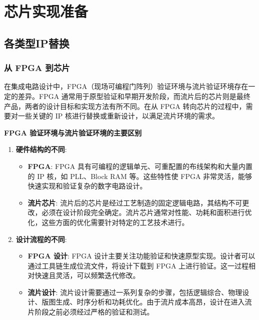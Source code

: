 
\chapter{芯片实现准备}\label{chap:15-chip-preparation}

\section{各类型IP替换}\label{sec:15-chip-preparation-001}

\subsection{从 FPGA 到芯片}\label{sec:15-chip-preparation-002}

在集成电路设计中，FPGA（现场可编程门阵列）验证环境与流片验证环境存在一定的差异。FPGA
通常用于原型验证和早期开发阶段，而流片后的芯片则是最终产品，两者的设计目标和实现方法有所不同。在从
FPGA 转向芯片的过程中，需要对一些关键的 IP
核进行替换或重新设计，以满足流片环境的需求。

\textbf{FPGA 验证环境与流片验证环境的主要区别}

\begin{enumerate}
\def\labelenumi{\arabic{enumi}.}
\tightlist
\item
  \textbf{硬件结构的不同}:

  \begin{itemize}
  \tightlist
  \item
    \textbf{FPGA}: FPGA
    具有可编程的逻辑单元、可重配置的布线架构和大量内置的 IP 核，如
    PLL、Block RAM 等。这些特性使 FPGA
    非常灵活，能够快速实现和验证复杂的数字电路设计。
  \item
    \textbf{流片芯片}:
    流片后的芯片是经过工艺制造的固定逻辑电路，其结构不可更改，必须在设计阶段完全确定。流片芯片通常对性能、功耗和面积进行优化，这些方面的优化需要针对特定的工艺技术进行。
  \end{itemize}
\item
  \textbf{设计流程的不同}:

  \begin{itemize}
  \tightlist
  \item
    \textbf{FPGA 设计}: FPGA
    设计主要关注功能验证和快速原型实现。设计者可以通过工具链生成位流文件，将设计下载到
    FPGA 上进行验证。这一过程相对快速且灵活，可以频繁迭代修改。
  \item
    \textbf{流片设计}:
    流片设计需要通过一系列复杂的步骤，包括逻辑综合、物理设计、版图生成、时序分析和功耗优化。由于流片成本高昂，设计在进入流片阶段之前必须经过严格的验证和测试。
  \end{itemize}
\end{enumerate}


